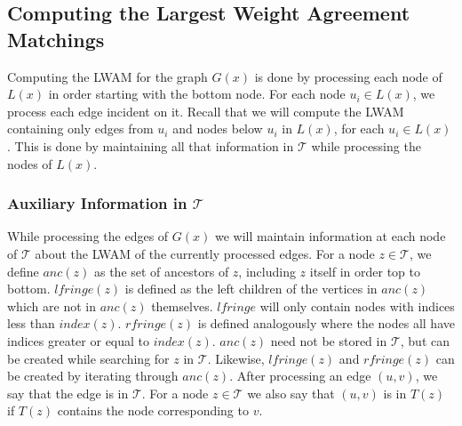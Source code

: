 \subsection{Computing the Largest Weight Agreement Matchings}
Computing the LWAM for the graph $G(x)$ is done by processing each node of $L(x)$ in order starting with the bottom node. For each node $u_i \in L(x)$, we process each edge incident on it. Recall that we will compute the LWAM containing only edges from $u_i$ and nodes below $u_i$ in $L(x)$, for each $u_i \in L(x)$. This is done by maintaining all that information in $\mathcal{T}$ while processing the nodes of $L(x)$.

\subsubsection{Auxiliary Information in $\mathcal{T}$}
While processing the edges of $G(x)$ we will maintain information at each node of $\mathcal{T}$ about the LWAM of the currently processed edges. For a node $z \in \mathcal{T}$, we define $anc(z)$ as the set of ancestors of $z$, including $z$ itself in order top to bottom. $lfringe(z)$ is defined as the left children of the vertices in $anc(z)$ which are not in $anc(z)$ themselves. $lfringe$ will only contain nodes with indices less than $index(z)$. $rfringe(z)$ is defined analogously where the nodes all have indices greater or equal to $index(z)$. $anc(z)$ need not be stored in $\mathcal{T}$, but can be created while searching for $z$ in $\mathcal{T}$. Likewise, $lfringe(z)$ and $rfringe(z)$ can be created by iterating through $anc(z)$. After processing an edge $(u,v)$, we say that the edge is in $\mathcal{T}$. For a node $z \in \mathcal{T}$ we also say that $(u,v)$ is in $T(z)$ if $T(z)$ contains the node corresponding to $v$.

